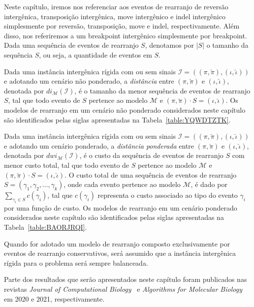 Neste capítulo, iremos nos referenciar aos eventos de rearranjo de reversão intergênica, transposição intergênica, move intergênico e indel intergênico simplesmente por reversão, transposição, move e indel, respectivamente. Além disso, nos referiremos a um breakpoint intergênico simplesmente por breakpoint. Dada uma sequência de eventos de rearranjo $S$, denotamos por $|S|$ o tamanho da sequência $S$, ou seja, a quantidade de eventos em $S$.

Dada uma instância intergênica rígida com ou sem sinais $\mathcal{I}=((\pi,\breve\pi),(\iota,\breve\iota))$ e adotando um cenário não ponderado, a \emph{distância} entre $(\pi,\breve\pi)$ e $(\iota,\breve\iota)$, denotada por $di_{\mathcal{M}}(\mathcal{I})$, é o tamanho da menor sequência de eventos de rearranjo $S$, tal que todo evento de $S$ pertence ao modelo $\mathcal{M}$ e $(\pi,\breve\pi) \cdot S = (\iota,\breve\iota)$. Os modelos de rearranjo em um cenário não ponderado considerados neste capítulo são identificados pelas siglas apresentadas na Tabela~\ref{table:YQWDTZTK}.



Dada uma instância intergênica rígida com ou sem sinais $\mathcal{I}=((\pi,\breve\pi),(\iota,\breve\iota))$ e adotando um cenário ponderado, a \emph{distância ponderada} entre $(\pi,\breve\pi)$ e $(\iota,\breve\iota)$, denotada por $dwi_{\mathcal{M}}(\mathcal{I})$, é o custo da sequência de eventos de rearranjo $S$ com menor custo total, tal que todo evento de $S$ pertence ao modelo $\mathcal{M}$ e $(\pi,\breve\pi) \cdot S = (\iota,\breve\iota)$. O custo total de uma sequência de eventos de rearranjo $S=(\gamma_1, \gamma_2, \dots, \gamma_k)$, onde cada evento pertence ao modelo $\mathcal{M}$, é dado por $\sum_{\gamma_i \in S} c(\gamma_i)$, tal que $c(\gamma_i)$ representa o custo associado ao tipo do evento $\gamma_i$ por uma função de custo. Os modelos de rearranjo em um cenário ponderado considerados neste capítulo são identificados pelas siglas apresentadas na Tabela~\ref{table:BAORJRQI}.



Quando for adotado um modelo de rearranjo composto exclusivamente por eventos de rearranjo conservativos, será assumido que a instância intergênica rígida para o problema será sempre balanceada.

Parte dos resultados que serão apresentados neste capítulo foram publicados nas revistas \emph{Journal of Computational Biology}~\cite{2020a-brito-etal} e \emph{Algorithms for Molecular Biology}~\cite{2021b-brito-etal} em 2020 e 2021, respectivamente.

